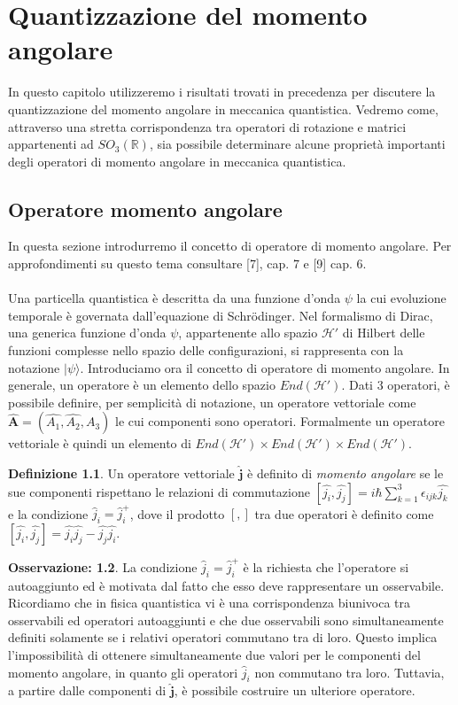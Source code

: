 \documentclass[12pt,a4paper]{report}
\theoremstyle{definition}
\newtheorem{Def}{Definizione}[chapter]
\theoremstyle{Theorem}
\theoremstyle{definition}
\theoremstyle{definition}
\theoremstyle{definition}
\newtheorem{Obs}[Def]{Osservazione:}
\begin{document}
\chapter{Quantizzazione del momento angolare}
In questo capitolo utilizzeremo i risultati trovati in precedenza per discutere la quantizzazione del momento angolare in meccanica quantistica. Vedremo come, attraverso una stretta corrispondenza tra operatori di rotazione e matrici appartenenti ad $SO_3(\mathbb{R})$, sia possibile determinare alcune proprietà importanti degli operatori di momento angolare in meccanica quantistica.
\section{Operatore momento angolare}
In questa sezione introdurremo il concetto di operatore di momento angolare. Per approfondimenti su questo tema consultare [7], cap. 7 e [9] cap. 6. \\
\\
Una particella quantistica è descritta da una funzione d'onda $\psi$ la cui evoluzione temporale è governata dall'equazione di Schrödinger. Nel formalismo di Dirac, una generica funzione d'onda $\psi$, appartenente allo spazio $\mathcal{H'}$ di Hilbert delle funzioni complesse nello spazio delle configurazioni, si rappresenta con la notazione $|\psi\rangle$. Introduciamo ora il concetto di operatore di momento angolare. In generale, un operatore è un elemento dello spazio $End(\mathcal{H'})$. Dati 3 operatori, è possibile definire, per semplicità di notazione, un operatore vettoriale come $\hat{\textbf{A}}=(\hat{A_1},\hat{A_2},\hat{A_3})$ le cui componenti sono operatori. Formalmente un operatore vettoriale è quindi un elemento di $End(\mathcal{H'})\times End(\mathcal{H'})\times End(\mathcal{H'})$.
\begin{Def}
	Un operatore vettoriale $\hat{\textbf{j}}$ è definito di \textit{momento angolare} se le sue componenti rispettano le relazioni di commutazione $[\hat{j_i},\hat{j_j}]=i\hbar\sum_{k=1}^{3}\epsilon_{ijk}\hat{j_k}$ e la condizione $\hat{j}_i=\hat{j}^+_i$, dove il prodotto $[,]$ tra due operatori è definito come $[\hat{j_i},\hat{j_j}]=\hat{j_i}\hat{j_j}-\hat{j_j}\hat{j_i}$.
\end{Def} 
\begin{Obs}
La condizione $\hat{j}_i=\hat{j}^+_i$ è la richiesta che l'operatore si autoaggiunto ed è motivata dal fatto che esso deve rappresentare un osservabile. Ricordiamo che in fisica quantistica vi è una corrispondenza biunivoca tra osservabili ed operatori autoaggiunti e che due osservabili sono simultaneamente definiti solamente se i relativi operatori commutano tra di loro. Questo implica l'impossibilità di ottenere simultaneamente due valori per le componenti del momento angolare, in quanto gli operatori $\hat{j}_i$ non commutano tra loro. Tuttavia, a partire dalle componenti di $\hat{\textbf{j}}$, è possibile costruire un ulteriore operatore.
\end{Obs}
\end{document}

